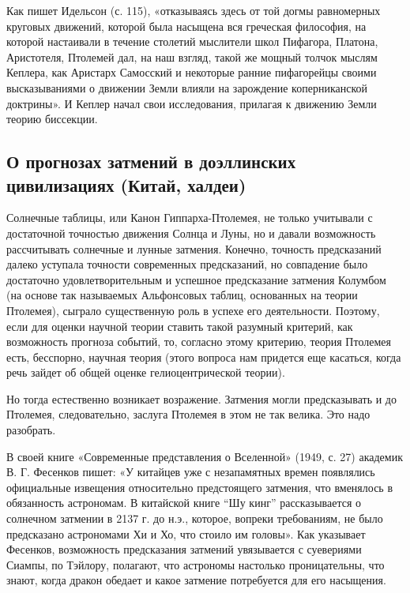 Как  пишет  Идельсон  (с.  115),   «отказываясь  здесь  от  той  догмы
равномерных  круговых движений,  которой была  насыщена вся  греческая
философия,  на которой  настаивали в  течение столетий  мыслители школ
Пифагора, Платона, Аристотеля,  Птолемей дал, на наш  взгляд, такой же
мощный  толчок  мыслям Кеплера,  как  Аристарх  Самосский и  некоторые
ранние пифагорейцы  своими высказываниями  о движении Земли  влияли на
зарождение коперниканской доктрины». И Кеплер начал свои исследования,
прилагая к движению Земли теорию биссекции.

\subsection{О  прогнозах затмений  в доэллинских  цивилизациях (Китай,
халдеи)}

Солнечные таблицы, или Канон  Гиппарха-Птолемея, не только учитывали с
достаточной точностью движения Солнца и  Луны, но и давали возможность
рассчитывать   солнечные   и   лунные  затмения.   Конечно,   точность
предсказаний  далеко уступала  точности  современных предсказаний,  но
совпадение было достаточно  удовлетворительным и успешное предсказание
затмения  Колумбом  (на  основе  так  называемых  Альфонсовых  таблиц,
основанных на теории Птолемея), сыграло существенную роль в успехе его
деятельности. Поэтому,  если для  оценки научной теории  ставить такой
разумный  критерий, как  возможность  прогноза  событий, то,  согласно
этому критерию, теория Птолемея есть, бесспорно, научная теория (этого
вопроса нам придется  еще касаться, когда речь зайдет  об общей оценке
гелиоцентрической теории).

Но   тогда   естественно    возникает   возражение.   Затмения   могли
предсказывать и до Птолемея, следовательно, заслуга Птолемея в этом не
так велика. Это надо разобрать.

В своей  книге «Современные представления  о Вселенной» (1949,  с. 27)
академик В. Г.  Фесенков пишет: «У китайцев уже  с незапамятных времен
появлялись официальные  извещения относительно  предстоящего затмения,
что вменялось в обязанность астрономам.  В китайской книге ``Шу кинг''
рассказывается  о  солнечном затмении  в  2137  г. до  н.э.,  которое,
вопреки  требованиям, не  было предсказано  астрономами Хи  и Хо,  что
стоило им  головы». Как  указывает Фесенков,  возможность предсказания
затмений увязывается  с суевериями  Сиампы, по Тэйлору,  полагают, что
астрономы настолько  проницательны, что знают, когда  дракон обедает и
какое затмение потребуется для его насыщения.

